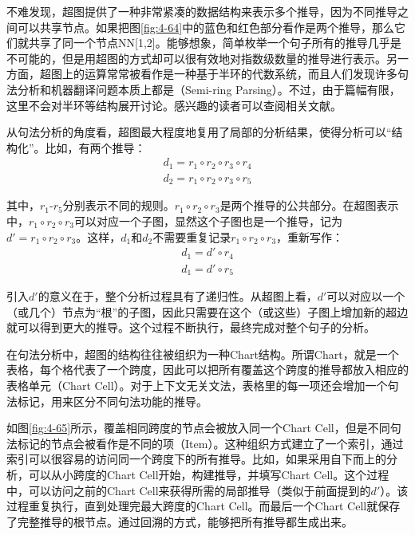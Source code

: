 \parinterval 不难发现，超图提供了一种非常紧凑的数据结构来表示多个推导，因为不同推导之间可以共享节点。如果把图\ref{fig:4-64}中的蓝色和红色部分看作是两个推导，那么它们就共享了同一个节点NN[1,2]。能够想象，简单枚举一个句子所有的推导几乎是不可能的，但是用超图的方式却可以很有效地对指数级数量的推导进行表示。另一方面，超图上的运算常常被看作是一种基于半环的代数系统，而且人们发现许多句法分析和机器翻译问题本质上都是{\small{}}（Semi-ring Parsing）。不过，由于篇幅有限，这里不会对半环等结构展开讨论。感兴趣的读者可以查阅相关文献\cite{goodman1999semiring,eisner2002parameter}。

\parinterval 从句法分析的角度看，超图最大程度地复用了局部的分析结果，使得分析可以``结构化''。比如，有两个推导：
\begin{eqnarray}
d_1 = {r_1} \circ {r_2} \circ {r_3} \circ {r_4} \label{eqa4.30}\\
d_2 = {r_1} \circ {r_2} \circ {r_3} \circ {r_5}
\label{eq:4-31}
\end{eqnarray}

\noindent 其中，$r_1$-$r_5$分别表示不同的规则。${r_1} \circ {r_2} \circ {r_3}$是两个推导的公共部分。在超图表示中，${r_1} \circ {r_2} \circ {r_3}$可以对应一个子图，显然这个子图也是一个推导，记为${d'}= {r_1} \circ {r_2} \circ {r_3}$。这样，$d_1$和$d_2$不需要重复记录${r_1} \circ {r_2} \circ {r_3}$，重新写作：
\begin{eqnarray}
d_1 = {d'} \circ {r_4} \label{eqa4.32}\\
d_1 = {d'} \circ {r_5}
\label{eq:4-33}
\end{eqnarray}

\parinterval 引入$d'$的意义在于，整个分析过程具有了递归性。从超图上看，$d'$可以对应以一个（或几个）节点为``根''的子图，因此只需要在这个（或这些）子图上增加新的超边就可以得到更大的推导。这个过程不断执行，最终完成对整个句子的分析。

\parinterval 在句法分析中，超图的结构往往被组织为一种Chart结构。所谓Chart，就是一个表格，每个格代表了一个跨度，因此可以把所有覆盖这个跨度的推导都放入相应的表格单元（Chart Cell）。对于上下文无关文法，表格里的每一项还会增加一个句法标记，用来区分不同句法功能的推导。

如图\ref{fig:4-65}所示，覆盖相同跨度的节点会被放入同一个Chart Cell，但是不同句法标记的节点会被看作是不同的项（Item）。这种组织方式建立了一个索引，通过索引可以很容易的访问同一个跨度下的所有推导。比如，如果采用自下而上的分析，可以从小跨度的Chart Cell开始，构建推导，并填写Chart Cell。这个过程中，可以访问之前的Chart Cell来获得所需的局部推导（类似于前面提到的$d'$）。该过程重复执行，直到处理完最大跨度的Chart Cell。而最后一个Chart Cell就保存了完整推导的根节点。通过回溯的方式，能够把所有推导都生成出来。

